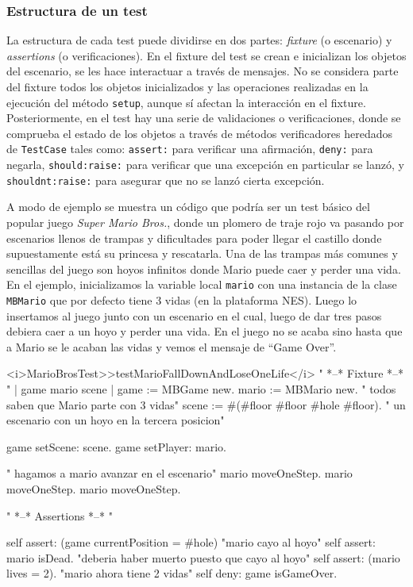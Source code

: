 \subsubsection{Estructura de un test}
\par La estructura de cada test puede dividirse en dos partes: \emph{fixture} (o escenario) y \emph{assertions} (o verificaciones). En el fixture del test se crean e inicializan los objetos del escenario, se les hace interactuar a través de mensajes. No se considera parte del fixture todos los objetos inicializados y las operaciones realizadas en la ejecución del método {\tt setup}, aunque sí afectan la interacción en el fixture. Posteriormente, en el test hay una serie de validaciones o verificaciones, donde se comprueba el estado de los objetos a través de métodos verificadores heredados de {\tt TestCase} tales como: {\tt assert:} para verificar una afirmación, {\tt deny:} para negarla, {\tt should:raise:} para verificar que una excepción en particular se lanzó, y {\tt shouldnt:raise:} para asegurar que no se lanzó cierta excepción.

\par A modo de ejemplo se muestra un código que podría ser un test básico del popular juego \emph{Super Mario Bros.}, donde un plomero de traje rojo va pasando por escenarios llenos de trampas y dificultades para poder llegar el castillo donde supuestamente está su princesa y rescatarla. Una de las trampas más comunes y sencillas del juego son hoyos infinitos donde Mario puede caer y perder una vida. En el ejemplo, inicializamos la variable local {\tt mario} con una instancia de la clase {\tt MBMario} que por defecto tiene 3 vidas (en la plataforma NES). Luego lo insertamos al juego junto con un escenario en el cual, luego de dar tres pasos debiera caer a un hoyo y perder una vida. En el juego no se acaba sino hasta que a Mario se le acaban las vidas y vemos el mensaje de ``Game Over''. 

\begin{codeWithLineNumbers}
<i>MarioBrosTest>>testMarioFallDownAndLoseOneLife</i>
	" *--* Fixture *--* "
	| game mario scene |
	game := MBGame new.
	mario := MBMario new. " todos saben que Mario parte con 3 vidas"
	scene := #(#floor #floor #hole #floor). " un escenario con un hoyo en la tercera posicion"

	game setScene: scene.
	game setPlayer: mario.

	" hagamos a mario avanzar en el escenario"
	mario moveOneStep. 
	mario moveOneStep.
	mario moveOneStep. 
		
	" *--* Assertions *--* "
	
	self assert: (game currentPosition = #hole) "mario cayo al hoyo" 
	self assert: mario isDead. "deberia haber muerto puesto que cayo al hoyo"
	self assert: (mario lives = 2). "mario ahora tiene 2 vidas"
	self deny: game isGameOver. 
	

\end{codeWithLineNumbers}


